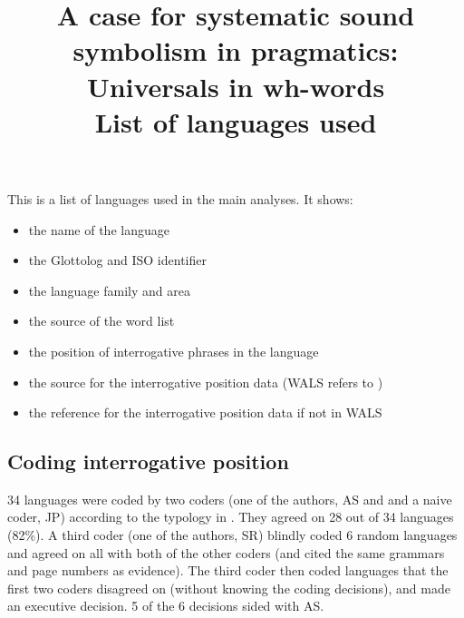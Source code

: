 \documentclass[8pt,landscape,a4paper]{article}
\title{A case for systematic sound symbolism in pragmatics: Universals in wh-words \\ List of languages used}
\author{}
\date{} %
\begin{document}
\maketitle

This is a list of languages used in the main analyses.  It shows:
\begin{itemize}
\item the name of the language
\item the Glottolog and ISO identifier
\item the language family and area
\item the source of the word list
\item the position of interrogative phrases in the language
\item the source for the interrogative position data (WALS refers to \cite{wals-93})
\item the reference for the interrogative position data if not in WALS
\end{itemize}

\subsection*{Coding interrogative position}
34 languages were coded by two coders (one of the authors, AS and and a naive coder, JP) according to the typology in \cite{wals-93}.  They agreed on 28 out of 34 languages (82\%).  A third coder (one of the authors, SR) blindly coded 6 random languages and agreed on all with both of the other coders (and cited the same grammars and page numbers as evidence).  The third coder then coded languages that the first two coders disagreed on (without knowing the coding decisions), and made an executive decision.  5 of the 6 decisions sided with AS. 

\clearpage
\newpage

{\footnotesize

}

\clearpage
\newpage



\end{document}
